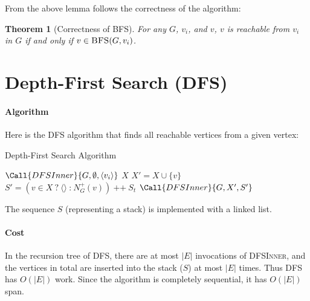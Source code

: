\documentclass[11pt,a4paper,oneside,microtype,chapter,nokorean]{oblivoir}
\newtheorem{theorem}{Theorem}
\begin{document}
From the above lemma follows the correctness of the algorithm:

\begin{theorem}[Correctness of \textsc{BFS}] For any $G$, $v_i$, and $v$, $v$ is reachable from
  $v_i$ in $G$ if and only if $v \in \textsc{BFS}(G,v_i)$.
\end{theorem}



\section{Depth-First Search (DFS)}

\paragraph{Algorithm}

Here is the DFS algorithm that finds all reachable vertices from a given vertex:

\begin{algorithm}
  \caption{Depth-First Search Algorithm}\label{dfs}
  \begin{algorithmic}[1]
     
    \State $\Call{DFSInner}{G,\emptyset,\langle v_i\rangle}$
    \EndProcedure
    \Statex
     
    \State $X$
    \EndCase
    \State $X' = X \cup \{v\}$
    \State $S' = (v \in X~\texttt{?}~\langle \rangle~\texttt{:}~N^+_G(v))~\texttt{++}~S_t$
    \State $\Call{DFSInner}{G,X',S'}$
    \EndCase
    \EndSwitch
    \EndProcedure
  \end{algorithmic}
\end{algorithm}

The sequence $S$ (representing a stack) is implemented with a linked list.


\paragraph{Cost}

In the recursion tree of \textsc{DFS}, there are at most $|E|$ invocations of \textsc{DFSInner}, and
the vertices in total are inserted into the stack ($S$) at most $|E|$ times.  Thus \textsc{DFS} has
$O(|E|)$ work.  Since the algorithm is completely sequential, it has $O(|E|)$ span.
\end{document}
